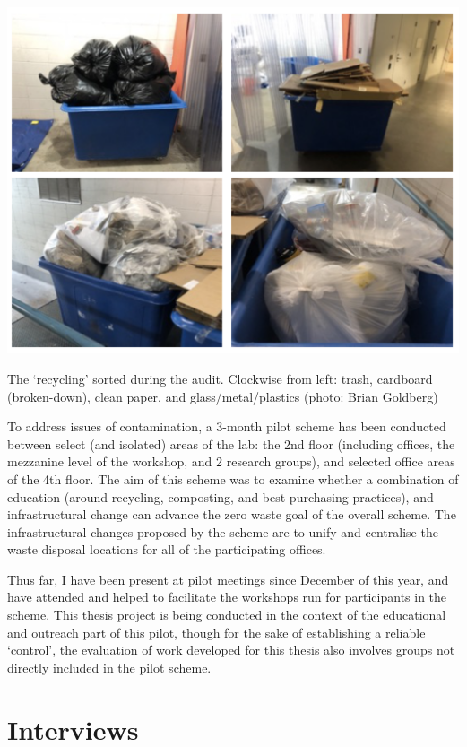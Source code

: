 \documentclass[nofonts,nols,justified,nobib]{tufte-book}
\begin{document}
\begin{marginfigure}
\includegraphics[width=\textwidth]{img/2/post-audit.png}
\caption{The `recycling' sorted during the audit. Clockwise from left: trash, cardboard (broken-down), clean paper, and glass/metal/plastics (photo: Brian Goldberg)}
\end{marginfigure}

To address issues of contamination, a 3-month pilot scheme has been conducted between select (and isolated) areas of the lab: the 2nd floor (including offices, the mezzanine level of the workshop, and 2 research groups), and selected office areas of the 4th floor. The aim of this scheme was to examine whether a combination of education (around recycling, composting, and best purchasing practices), and infrastructural change can advance the zero waste goal of the overall scheme. The infrastructural changes proposed by the scheme are to unify and centralise the waste disposal locations for all of the participating offices. 

Thus far, I have been present at pilot meetings since December of this year, and have attended and helped to facilitate the workshops run for participants in the scheme. This thesis project is being conducted in the context of the educational and outreach part of this pilot, though for the sake of establishing a reliable `control', the evaluation of work developed for this thesis also involves groups not directly included in the pilot scheme.

\newpage

\section*{Interviews}
\end{document}
